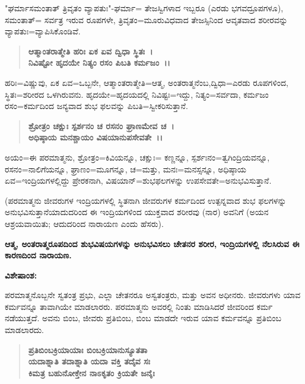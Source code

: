 "ಘರ್ಮಾಸಮಂತಾತ್ ತ್ರಿವೃತಂ ವ್ಯಾಪತುಃ"-ಘರ್ಮಾ= ತೇಜಸ್ವಿಗಳಾದ ಇಬ್ಬರೂ (ಎರಡು ಭಗವದ್ರೂಪಗಳೂ), ಸಮಂತಾತ್= ಸರ್ವತ್ರ ಇರುವ ರೂಪಗಳೇ, ತ್ರಿವೃತಂ=\break ಮೂರುವಿಧವಾದ ತೇಜಸ್ಸಿನಿಂದ ಆವೃತವಾದ ಶರೀರವನ್ನು ವ್ಯಾಪತುಃ=ವ್ಯಾಪಿಸಿಕೊಂಡಿವೆ.


\begin{verse}
\textbf{ಆತ್ಮಾಂತರಾತ್ಮೇತಿ ಹರಿಃ ಏಕ ಏವ ದ್ವಿಧಾ ಸ್ಥಿತಃ~।}\\\textbf{ನಿವಿಷ್ಟೋ ಹೃದಯೇ ನಿತ್ಯಂ ರಸಂ ಪಿಬತಿ ಕರ್ಮಜಂ~।।}
\end{verse}


\vskip 3pt

ಹರಿಃ=ವಿಷ್ಣುವು, ಏಕ ಏವ=ಒಬ್ಬನೇ, ಆತ್ಮಾಂತರಾತ್ಮೇತಿ=ಆತ್ಮ, ಅಂತರಾತ್ಮನೆಂಬ,\break ದ್ವಿಧಾ=ಎರಡು ರೂಪಗಳಿಂದ, ಸ್ಥಿತಃ=ಶರೀರದ ಒಳಗಿರುವನು. ಹೃದಯೇ=ಹೃದಯದಲ್ಲಿ ನಿವಿಷ್ಟಃ=ಇದ್ದು, ನಿತ್ಯಂ=ಸರ್ವದಾ, ಕರ್ಮಜಂ ರಸಂ=ಕರ್ಮದಿಂದ ಜನ್ಯವಾದ ಶುಭ ಫಲವನ್ನು ಪಿಬತಿ=ಸ್ವೀಕರಿಸುತ್ತಾನೆ.

\begin{verse}
\textbf{ಶ್ರೋತ್ರಂ ಚಕ್ಷುಃ ಸ್ಪರ್ಶನಂ ಚ ರಸನಂ ಘ್ರಾಣಮೇವ ಚ~।}\\\textbf{ಅಧಿಷ್ಠಾಯ ಮನಶ್ಚಾಯಂ ವಿಷಯಾನುಪಸೇವತೇ~।।}
\end{verse}


\vskip 3pt

ಅಯಂ=ಈ ಪರಮಾತ್ಮನು, ಶ್ರೋತ್ರಂ=ಕಿವಿಯನ್ನೂ, ಚಕ್ಷುಃ= ಕಣ್ಣನ್ನೂ, ಸ್ಪರ್ಶಃನಂ=ತ್ವಗಿಂದ್ರಿಯವನ್ನೂ, ರಸನಂ=ನಾಲಿಗೆಯನ್ನೂ, ಘ್ರಾಣಂ=ಮೂಗನ್ನೂ, ಚ=ಮತ್ತು, ಮನಃ=ಮನಸ್ಸನ್ನೂ, ಅಧಿಷ್ಠಾಯ ಏವ=ಇಂದ್ರಿಯಗಳಲ್ಲಿದ್ದು ಪ್ರೇರಕನಾಗಿ, ವಿಷಯಾನ್=\-ಶುಭಫಲಗಳನ್ನು ಉಪಸೇವತೇ=ಅನುಭವಿಸುತ್ತಾನೆ.

(ಪರಮಾತ್ಮನು ಜೀವರುಗಳ ಇಂದ್ರಿಯಗಳಲ್ಲಿ ಸ್ಥಿತನಾಗಿ ಜೀವರುಗಳ ಕರ್ಮದಿಂದ ಉತ್ಪನ್ನವಾದ ಶುಭ ಫಲಗಳನ್ನು ಅನುಭವಿಸುತ್ತಾನೆಯಾದುದರಿಂದ ಈ ಇಂದ್ರಿಯಗಳಿಂದ ಯುಕ್ತವಾದ ಶರೀರವು (ನಾರ) ಅವನಿಗೆ (ಅಯನ ಆಶ್ರಯವಾಯಿತು; ಆದುದರಿಂದ ನಾರಾಯಣ ಎಂದು ಹೆಸರು).

\begin{center}
\textbf{ಆತ್ಮ, ಅಂತರಾತ್ಮರೂಪದಿಂದ ಶುಭವಿಷಯಗಳನ್ನು ಅನುಭವಿಸಲು ಚೇತನರ ಶರೀರ, ಇಂದ್ರಿಯಗಳಲ್ಲಿ ನೆಲಸಿರುವ ಈ ಕಾರಣದಿಂದ ನಾರಾಯಣ.}
\end{center}

\noindent
\textbf{ವಿಶೇಷಾಂಶ:\enginline{-}}

ಪರಮಾತ್ಮನೊಬ್ಬನೇ ಸ್ವತಂತ್ರ ಪ್ರಭು, ಎಲ್ಲಾ ಚೇತನರೂ ಅಸ್ವತಂತ್ರರು, ಮತ್ತು ಅವನ ಅಧೀನರು. ಜೀವರುಗಳು ಯಾವ ಕರ್ಮವನ್ನೂ ತಾವಾಗಿಯೇ ಮಾಡಲಾರರು. ಪರಮಾತ್ಮನು ಅವರಲ್ಲಿ ನಿಂತು ಮಾಡಿಸಿದರೆ ಜೀವರಿಂದ ಕರ್ಮ ನಡೆಯುತ್ತದೆ. ಅವನು ಬಿಂಬ, ಜೀವರು ಪ್ರತಿಬಿಂಬ, ಬಿಂಬ ಮಾಡದೇ ಇರುವ ಯಾವ ಕರ್ಮವನ್ನೂ ಪ್ರತಿಬಿಂಬ ಮಾಡಲಾರದು.

\begin{verse}
\textbf{ಪ್ರತಿಬಿಂಬಕ್ರಿಯಾಯಾಃ ಬಿಂಬಕ್ರಿಯಾನುಸ್ಯೂತತಾ}\\\textbf{ಯದಾಶ್ನಾತಿ ತದಾಶ್ನಾತಿ ಯದಾ ವಕ್ತಿ ತದೈವ ಸಃ}\\\textbf{ಕಿಮತ್ರ ಬಹುನೋಕ್ತೇನ ನಾಽಕೃತಂ ಕ್ರಿಯತೇ ಜನೈಃ}
\end{verse}

